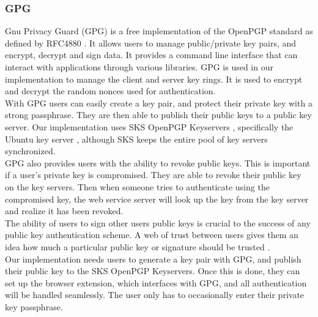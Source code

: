 \documentclass[11pt]{article}
\begin{document}
\subsubsection{GPG}
Gnu Privacy Guard (GPG) is a free implementation of the OpenPGP standard as defined by RFC4880 \cite{gpg}. It allows users to manage public/private key pairs, and encrypt, decrypt and sign data. It provides a command line interface that can interact with applications through various libraries. GPG is used in our implementation to manage the client and server key rings. It is used to encrypt and decrypt the random nonces used for authentication.\\
With GPG users can easily create a key pair, and protect their private key with a strong passphrase. They are then able to publish their public keys to a public key server. Our implementation uses SKS OpenPGP Keyservers \cite{sks}, specifically the Ubuntu key server \cite{ubuntuKey}, although SKS keeps the entire pool of key servers synchronized.\\
GPG also provides users with the ability to revoke public keys. This is important if a user's private key is compromised. They are able to revoke their public key on the key servers. Then when someone tries to authenticate using the compromised key, the web service server will look up the key from the key server and realize it has been revoked.\\
The ability of users to sign other users public keys is crucial to the success of any public key authentication scheme. A web of trust between users gives them an idea how much a particular public key or signature should be trusted \cite{weboftrust}.\\
Our implementation needs users to generate a key pair with GPG, and publish their public key to the SKS OpenPGP Keyservers. Once this is done, they can set up the browser extension, which interfaces with GPG, and all authentication will be handled seamlessly. The user only has to occasionally enter their private key passphrase.
\end{document}

